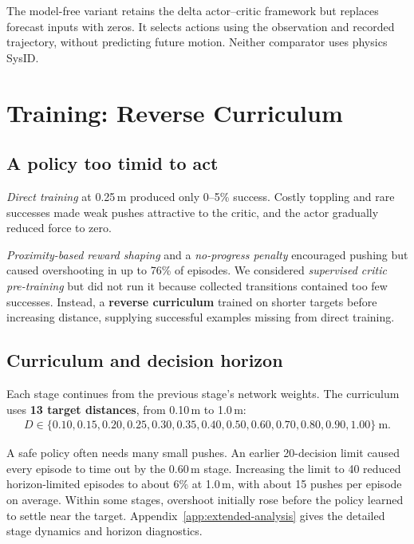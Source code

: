 \documentclass[12pt]{article}
\begin{document}
The model-free variant retains the delta actor--critic framework but replaces forecast inputs with zeros. It selects actions using the observation and recorded trajectory, without predicting future motion. Neither comparator uses physics SysID.

\section{Training: Reverse Curriculum}\label{sec:curriculum}
\subsection{A policy too timid to act}\label{sec:timid}
\emph{Direct training} at 0.25\,m produced only 0--5\% success. Costly toppling and rare successes made weak pushes attractive to the critic, and the actor gradually reduced force to zero.

\emph{Proximity-based reward shaping} and a \emph{no-progress penalty} encouraged pushing but caused overshooting in up to 76\% of episodes. We considered \emph{supervised critic pre-training} but did not run it because collected transitions contained too few successes. Instead, a \textbf{reverse curriculum} trained on shorter targets before increasing distance, supplying successful examples missing from direct training.

\subsection{Curriculum and decision horizon}
Each stage continues from the previous stage's network weights. The curriculum uses \textbf{13 target distances}, from 0.10\,m to 1.0\,m:
\begin{equation*}\begin{gathered}
D\in\{0.10,0.15,0.20,0.25,0.30,0.35,0.40,0.50,0.60,0.70,0.80,0.90,1.00\}\ \mathrm m.
\end{gathered}\end{equation*}

A safe policy often needs many small pushes. An earlier 20-decision limit caused every episode to time out by the 0.60\,m stage. Increasing the limit to 40 reduced horizon-limited episodes to about 6\% at 1.0\,m, with about 15 pushes per episode on average. Within some stages, overshoot initially rose before the policy learned to settle near the target. Appendix~\ref{app:extended-analysis} gives the detailed stage dynamics and horizon diagnostics.
\end{document}
